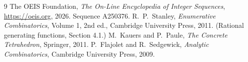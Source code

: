 \documentclass[11pt,a4paper]{article}
\theoremstyle{plain}
\theoremstyle{definition}
\begin{document}
\begin{thebibliography}{9}
 The OEIS Foundation, \emph{The On-Line Encyclopedia of Integer
Sequences}, \url{https://oeis.org}, 2026. Sequence A250376.
 R.~P.~Stanley, \emph{Enumerative Combinatorics}, Volume 1, 2nd ed.,
Cambridge University Press, 2011. (Rational generating functions, Section 4.1.)
 M.~Kauers and P.~Paule, \emph{The Concrete Tetrahedron}, Springer, 2011.
 P.~Flajolet and R.~Sedgewick, \emph{Analytic Combinatorics}, Cambridge
University Press, 2009.
\end{thebibliography}
\end{document}
